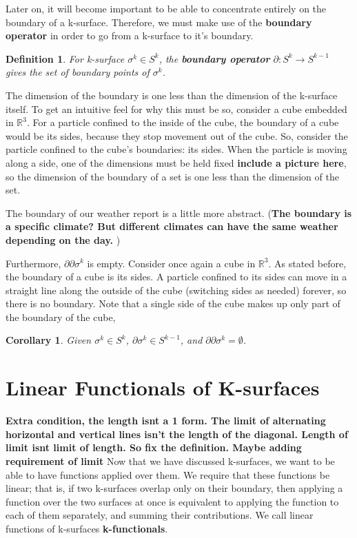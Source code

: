 \documentclass{book}
\newtheorem{defn}[equation]{Definition}
\newtheorem{coro}[equation]{Corollary}
\begin{document}
Later on, it will become important to be able to concentrate entirely on the boundary of a k-surface. Therefore, we must make use of the \textbf{boundary operator} in order to go from a k-surface to it's boundary. 

\begin{defn}
	For k-surface $\sigma^k \in S^k$, the \textbf{boundary operator} $\partial : S^k \to S^{k-1}$ gives the set of boundary points of $\sigma^k$. 
\end{defn}

The dimension of the boundary is one less than the dimension of the k-surface itself. To get an intuitive feel for why this must be so, consider a cube embedded in $\mathbb{R}^3$. For a particle confined to the inside of the cube, the boundary of a cube would be its sides, because they stop movement out of the cube. So, consider the particle confined to the cube's boundaries: its sides. When the particle is moving along a side, one of the dimensions must be held fixed \textbf{include a picture here}, so the dimension of the boundary of a set is one less than the dimension of the set. 


The boundary of our weather report is a little more abstract. (\textbf{The boundary is a specific climate? But different climates can have the same weather depending on the day. })

Furthermore, $\partial\partial \sigma^k$ is empty. Consider once again a cube in $\mathbb{R}^3$. As stated before, the boundary of a cube is its sides. A particle confined to its sides can move in a straight line along the outside of the cube (switching sides as needed) forever, so there is no boundary. Note that a single side of the cube makes up only part of the boundary of the cube, 

\begin{coro}
	Given $\sigma^k \in S^k$, $\partial \sigma^k \in S^{k-1}$, and $\partial\partial \sigma^k = \emptyset$. 
\end{coro}


\section{Linear Functionals of K-surfaces}


\textbf{Extra condition, the length isnt a 1 form. The limit of alternating horizontal and vertical lines isn't the length of the diagonal. Length of limit isnt limit of length. So fix the definition. Maybe adding requirement of limit}
Now that we have discussed k-surfaces, we want to be able to have functions applied over them. We require that these functions be linear; that is, if two k-surfaces overlap only on their boundary, then applying a function over the two surfaces at once is equivalent to applying the function to each of them separately, and summing their contributions. We call linear functions of k-surfaces \textbf{k-functionals}. 
\end{document}
